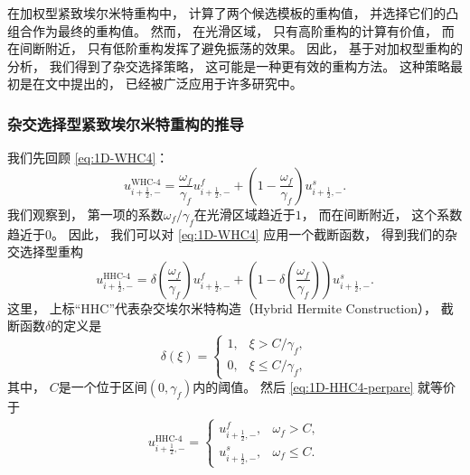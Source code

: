 在加权型紧致埃尔米特重构中，
计算了两个候选模板的重构值，
并选择它们的凸组合作为最终的重构值。
然而，
在光滑区域，
只有高阶重构的计算有价值，
而在间断附近，
只有低阶重构发挥了避免振荡的效果。
因此，
基于对加权型重构的分析，
我们得到了杂交选择策略，
这可能是一种更有效的重构方法。
这种策略最初是在文\cite{hybrid-first}中提出的，
已经被广泛应用于许多研究中。

\subsubsection{杂交选择型紧致埃尔米特重构的推导}

我们先回顾 \cref{eq:1D-WHC4}：
\begin{equation*}
  u_{i+\frac{1}{2},-}^{\text{WHC-4}}= \frac{\omega_{{f}}}{\gamma_{{f}}}u_{i+\frac{1}{2},-}^{{f}}+ \left(1 - \frac{\omega_{{f}}}{\gamma_{{f}}}\right) {u}_{i+\frac{1}{2},-}^{{s}}.
\end{equation*}
我们观察到，
第一项的系数${\omega_{{f}}}/{\gamma_{{f}}}$在光滑区域趋近于$1$，
而在间断附近，
这个系数趋近于$0$。
因此，
我们可以对 \cref{eq:1D-WHC4} 应用一个截断函数，
得到我们的杂交选择型重构
\begin{equation}
  \label{eq:1D-HHC4-perpare}
  u_{i+\frac{1}{2},-}^{\text{HHC-4}}= \delta\left(\frac{\omega_{{f}}}{\gamma_{{f}}}\right) u_{i+\frac{1}{2},-}^{{f}}+ \left(1-\delta\left(\frac{\omega_{{f}}}{\gamma_{{f}}}\right) \right) {u}_{i+\frac{1}{2},-}^{{s}}.
\end{equation}
这里，
上标“HHC”代表杂交埃尔米特构造（Hybrid Hermite Construction），
截断函数$\delta$的定义是
\begin{equation}
  \label{eq:1D-truncation-function}
  \delta(\xi) =
  \begin{cases}
    1, & \xi > {C}/{\gamma_{{f}}},   \\
    0, & \xi \le{C}/{\gamma_{{f}}},
  \end{cases}
\end{equation}
其中，
$C$是一个位于区间$(0,\gamma_{{f}})$内的阈值。
然后 \cref{eq:1D-HHC4-perpare} 就等价于
\begin{equation}
  \label{eq:1D-HHC-4}
  \begin{aligned}
    u_{i+\frac{1}{2},-}^{\text{HHC-4}}=
    \begin{cases}
      u_{i+\frac{1}{2},-}^{{f}}, & \omega_{{f}}> C ,   \\
      u_{i+\frac{1}{2},-}^{{s}}, & \omega_{{f}}\le C.
    \end{cases}
  \end{aligned}
\end{equation}
